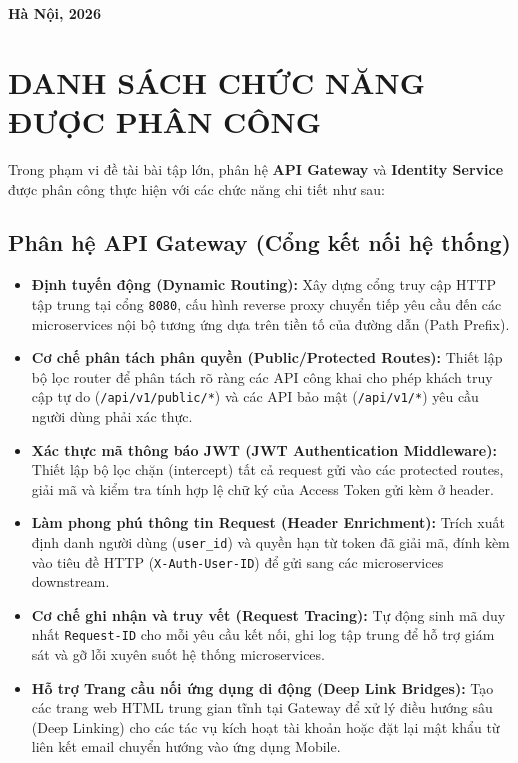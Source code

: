 \documentclass[14pt,a4paper,oneside]{extreport}
\begin{document}
\begin{titlepage}
\begin{center}
    \vfill

    \textbf{Hà Nội, 2026}

  \end{center}
\end{titlepage}

\newpage
\tableofcontents

\newpage
\listoffigures
\listoftables

\chapter{DANH SÁCH CHỨC NĂNG ĐƯỢC PHÂN CÔNG}
\label{chap:danh-sach-chuc-nang}

Trong phạm vi đề tài bài tập lớn, phân hệ \textbf{API Gateway} và \textbf{Identity Service} được phân công thực hiện với các chức năng chi tiết như sau:

\section{Phân hệ API Gateway (Cổng kết nối hệ thống)}
\begin{itemize}[leftmargin=1.5cm]
  \item \textbf{Định tuyến động (Dynamic Routing):} Xây dựng cổng truy cập HTTP tập trung tại cổng \texttt{8080}, cấu hình reverse proxy chuyển tiếp yêu cầu đến các microservices nội bộ tương ứng dựa trên tiền tố của đường dẫn (Path Prefix).
  \item \textbf{Cơ chế phân tách phân quyền (Public/Protected Routes):} Thiết lập bộ lọc router để phân tách rõ ràng các API công khai cho phép khách truy cập tự do (\texttt{/api/v1/public/*}) và các API bảo mật (\texttt{/api/v1/*}) yêu cầu người dùng phải xác thực.
  \item \textbf{Xác thực mã thông báo JWT (JWT Authentication Middleware):} Thiết lập bộ lọc chặn (intercept) tất cả request gửi vào các protected routes, giải mã và kiểm tra tính hợp lệ chữ ký của Access Token gửi kèm ở header.
  \item \textbf{Làm phong phú thông tin Request (Header Enrichment):} Trích xuất định danh người dùng (\texttt{user\_id}) và quyền hạn từ token đã giải mã, đính kèm vào tiêu đề HTTP (\texttt{X-Auth-User-ID}) để gửi sang các microservices downstream.
  \item \textbf{Cơ chế ghi nhận và truy vết (Request Tracing):} Tự động sinh mã duy nhất \texttt{Request-ID} cho mỗi yêu cầu kết nối, ghi log tập trung để hỗ trợ giám sát và gỡ lỗi xuyên suốt hệ thống microservices.
  \item \textbf{Hỗ trợ Trang cầu nối ứng dụng di động (Deep Link Bridges):} Tạo các trang web HTML trung gian tĩnh tại Gateway để xử lý điều hướng sâu (Deep Linking) cho các tác vụ kích hoạt tài khoản hoặc đặt lại mật khẩu từ liên kết email chuyển hướng vào ứng dụng Mobile.
\end{itemize}
\end{document}
